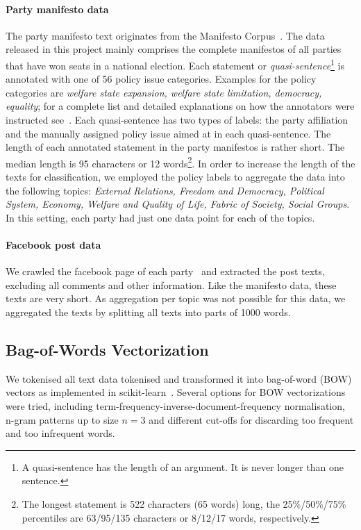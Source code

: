 \documentclass[11pt]{article}
\begin{document}
\paragraph{Party manifesto data}
The party manifesto text originates from the Manifesto Corpus~\cite{manifesto}. The data released in this project mainly comprises the complete manifestos of all parties that have won seats in a national election. Each statement or {\em quasi-sentence}\footnote{A quasi-sentence has the length of an argument. It is never longer than one sentence.} is annotated with one of 56 policy issue categories. Examples for the policy categories are {\em welfare state expansion, welfare state limitation, democracy, equality}; for a complete list and detailed explanations on how the annotators were instructed see~\cite{leftright}. Each quasi-sentence has two types of labels: the party affiliation and the manually assigned policy issue aimed at in each quasi-sentence. The length of each annotated statement in the party manifestos is rather short. The median length is 95 characters or 12 words\footnote{The longest statement is 522 characters (65 words) long, the 25\%/50\%/75\% percentiles are 63/95/135 characters or 8/12/17 words, respectively.}. 
In order to increase the length of the texts for classification, we employed the policy labels to aggregate the data into the following topics: {\em External Relations, Freedom and Democracy, Political System, Economy, Welfare and Quality of Life, Fabric of Society, Social Groups}. In this setting, each party had just one data point for each of the topics. 

\paragraph{Facebook post data}
We crawled the facebook page of each party~\cite{gruene-fb, spd-fb, cducsu-fb, linke-fb} and extracted the post texts, excluding all comments and other information. Like the manifesto data, these texts are very short. As aggregation per topic was not possible for this data, we aggregated the texts by splitting all texts into parts of 1000 words. 

\subsection{Bag-of-Words Vectorization}\label{sec:bow-vectorization}
We tokenised all text data tokenised and transformed it into bag-of-word (BOW) vectors as implemented in scikit-learn~\cite{scikit-learn}. Several options for BOW vectorizations were tried, including term-frequency-inverse-document-frequency normalisation, n-gram patterns up to size $n=3$ and different cut-offs for discarding too frequent and too infrequent words.
\end{document}
